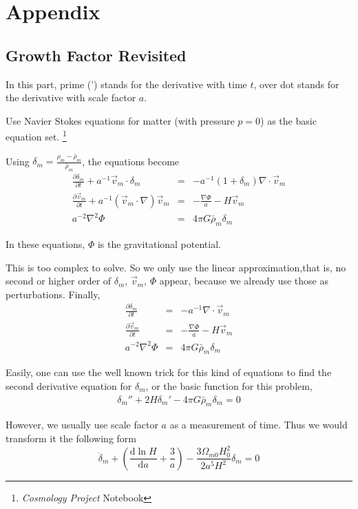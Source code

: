 \documentclass{article}
\begin{document}
\section{Appendix}

\subsection{Growth Factor Revisited}

In this part, prime (') stands for the derivative with time $t$, over dot stands for the derivative with scale factor $a$.

Use Navier Stokes equations for matter (with pressure $p=0$) as the basic equation set. {\footnote{{\it Cosmology Project} Notebook}}

Using $\delta_m=\frac{\rho_m-\bar\rho_m}{\bar\rho_m}$, the equations become
\begin{eqnarray}
\frac{\partial {\delta_m}}{\partial t}+a^{-1}\vec{v}_m\cdot \delta_m &=& -a^{-1}(1+\delta_m)\nabla\cdot\vec{v}_m \\
\frac{\partial \vec{v}_m}{\partial t}+ a^{-1}(\vec{v}_m\cdot \nabla)\vec v_m &=& -\frac{\nabla\Phi}{a}-H\vec v_m \\
a^{-2}\nabla^2\Phi &=& 4\pi G\bar\rho_m\delta_m
\end{eqnarray}

In these equations, $\Phi$ is the gravitational potential.

This is too complex to solve. So we only use the linear approximation,that is, no second or higher order of $\delta_m$, $\vec v_m$, $\Phi$ appear, because we already use those as perturbations.
Finally,
\begin{eqnarray}
\frac{\partial {\delta_m}}{\partial t}&=&-a^{-1}\nabla \cdot\vec{v}_m \\
\frac{\partial \vec{v}_m}{\partial t}&=& -\frac{\nabla\Phi}{a}-H\vec v_m \\
a^{-2}\nabla^2\Phi &=& 4\pi G\bar\rho_m\delta_m
\end{eqnarray}

Easily, one can use the well known trick for this kind of equations to find the second derivative equation for $\delta_m$, or the basic function for this problem,
\begin{eqnarray}
\delta_{m}''+2H\delta_m'-4\pi G \bar\rho_m \delta_m=0
\end{eqnarray}

However, we usually use scale factor $a$ as a measurement of time. Thus we would transform it the following form
\begin{equation}
\ddot \delta_m+(\frac{\mathrm d\ln{H}}{\mathrm da}+\frac{3}{a})-\frac{3\Omega_{m0}H_0^2}{2a^5H^2}\delta_m =0
\end{equation}
\end{document}

